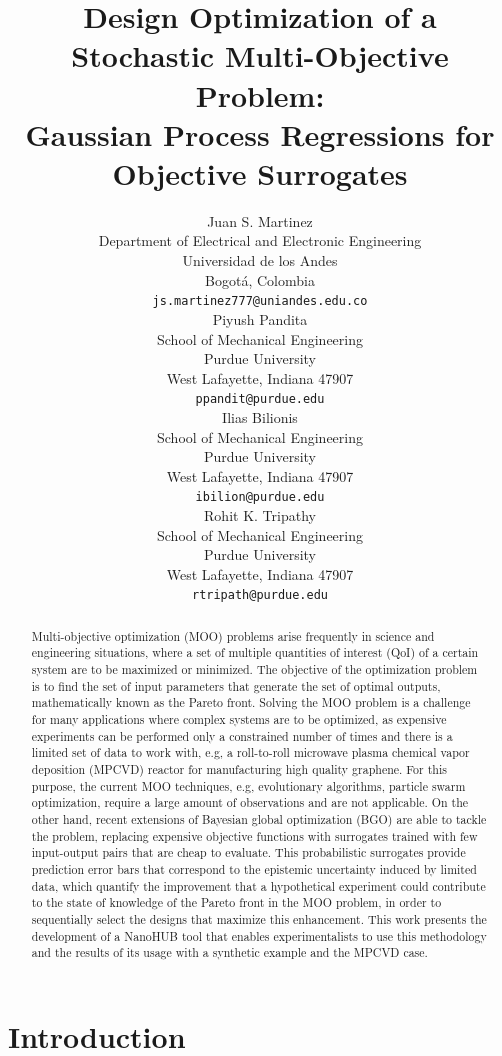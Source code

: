 \documentclass{article}
\title{Design Optimization of a Stochastic Multi-Objective Problem: \\Gaussian Process Regressions for Objective Surrogates}
\author{
  Juan S. Martinez\\
  Department of Electrical and Electronic Engineering\\
  Universidad de los Andes\\
  Bogotá, Colombia \\
  \texttt{js.martinez777@uniandes.edu.co} \\
  \And
  Piyush Pandita \\
  School of Mechanical Engineering \\
  Purdue University \\
  West Lafayette, Indiana 47907\\
  \texttt{ppandit@purdue.edu} \\
  \AND
  Ilias Bilionis \\
  School of Mechanical Engineering \\
  Purdue University \\
  West Lafayette, Indiana 47907\\
  \texttt{ibilion@purdue.edu} \\
  \And
  Rohit K. Tripathy \\
  School of Mechanical Engineering \\
  Purdue University \\
  West Lafayette, Indiana 47907\\
  \texttt{rtripath@purdue.edu} \\
}
\begin{document}

\maketitle

\begin{abstract}
    Multi-objective optimization (MOO) problems arise frequently in science and engineering situations, where a set of multiple quantities of interest (QoI) of a certain system are to be maximized or minimized. The objective of the optimization problem is to find the set of input parameters that generate the set of optimal outputs, mathematically known as the Pareto front. Solving the MOO problem is a challenge for many applications where complex systems are to be optimized, as expensive experiments can be performed only a constrained number of times and there is a limited set of data to work with, e.g, a roll-to-roll microwave plasma chemical vapor deposition (MPCVD) reactor for manufacturing high quality graphene. For this purpose, the current MOO techniques, e.g, evolutionary algorithms, particle swarm optimization, require a large amount of observations and are not applicable. On the other hand, recent extensions of Bayesian global optimization (BGO) are able to tackle the problem, replacing expensive objective functions with surrogates trained with few input-output pairs that are cheap to evaluate. This probabilistic surrogates provide prediction error bars that correspond to the epistemic uncertainty induced by limited data, which quantify the improvement that a hypothetical experiment could contribute to the state of knowledge of the Pareto front in the MOO problem, in order to sequentially select the designs that maximize this enhancement. This work presents the development of a NanoHUB tool that enables experimentalists to use this methodology and the results of its usage with a synthetic example and the MPCVD case.
\end{abstract}

\section{Introduction}
\end{document}
